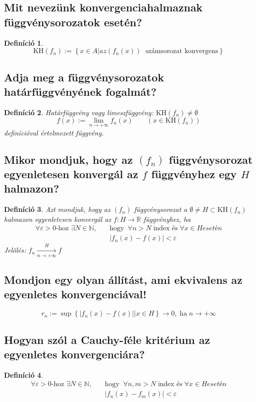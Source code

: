 \documentclass[12pt,a4paper]{article}
\newcommand{\R}{\mathbb{R}}
\newcommand{\N}{\mathbb{N}}
\newcommand{\fn}{f_n}
\newcommand{\KH}[1]{\text{KH}(#1)}
\newcommand{\bb}[1]{\left( #1 \right)}
\newcommand{\abs}[1]{\left| #1 \right|}
\newcommand{\braces}[1]{\left\lbrace #1 \right\rbrace}
\newtheorem{defi}{Definíció}[section]
\begin{document}
\subsection{Mit nevezünk konvergenciahalmaznak függvénysorozatok esetén?}
\begin{defi}
\[
\KH{f_n} := \braces{x\in A \vert az \bb{f_n(x)} \; \text{ számsorozat konvergens}}
\]
\end{defi}
\subsection{Adja meg a függvénysorozatok határfüggvényének fogalmát?}
\begin{defi}
Határfüggvény vagy limeszfüggvény: $\KH{\fn} \neq \emptyset$
\[
f(x) := \lim\limits_{n\to +\infty} \fn(x) \quad \quad \bb{x \in \KH{\fn}}
\]
definícióval értelmezett függvény.
\end{defi}
\subsection{Mikor mondjuk, hogy az $(f_n)$ függvénysorozat egyenletesen konvergál az $f$ függvényhez egy $H$ halmazon?}
\begin{defi}
Azt mondjuk, hogy az $\bb{\fn}$ függvénysorozat a $\emptyset \neq H \subset \KH{\fn}$ halmazon egyenletesen konvergál az $f: H \to \R$ függvényhez, ha
\begin{align*}
\forall \varepsilon > 0\text{-hoz } \exists N \in \N, \quad &\text{hogy} \;\; \forall n > N \; \text{index és} \; \forall x \in H esetén \\
&\abs{\fn(x) - f(x)} < \varepsilon
\end{align*}
Jelölés: $\fn \xrightarrow[n \to + \infty]{H} f$
\end{defi}
\subsection{Mondjon egy olyan állítást, ami ekvivalens az egyenletes konvergenciával!}
\[
r_n := \sup\braces{\abs{\fn(x)-f(x)} \vert x \in H} \to 0, \; \text{ha} \; n\to +\infty
\]
\subsection{Hogyan szól a Cauchy-féle kritérium az egyenletes konvergenciára?}
\begin{defi}
\begin{align*}
\forall \varepsilon > 0\text{-hoz } \exists N \in \N, \quad &\text{hogy} \;\; \forall n,m > N \; \text{index és} \; \forall x \in H esetén \\
&\abs{\fn(x) - f_m(x)} < \varepsilon
\end{align*}
\end{defi}
\end{document}
